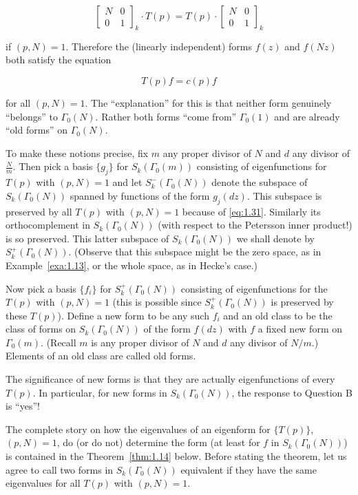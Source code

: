 \begin{equation}\label{eq:1.31}
\left[ \begin{array}{cc} N & 0 \\ 0 & 1 \end{array} \right]_k \cdot T(p) = T(p) \cdot \left[ \begin{array}{cc} N & 0 \\ 0 & 1 \end{array} \right]_k\tag{1.31}
\end{equation}

if $(p,N) = 1$. Therefore the (linearly independent) forms $f(z)$ and $f(Nz)$ both satisfy the equation

\[
T(p)f = c(p)f
\]

for all $(p,N) = 1$. The ``explanation'' for this is that neither form genuinely ``belongs'' to $\Gamma_0(N)$. Rather both forms ``come from'' $\Gamma_0(1)$ and are already ``old forms'' on $\Gamma_0(N)$.

To make these notions precise, fix $m$ any proper divisor of $N$ and $d$ any divisor of $\frac{N}{m}$. Then pick a basis $\{g_j\}$ for $S_k(\Gamma_0(m))$ consisting of eigenfunctions for $T(p)$ with $(p,N) = 1$ and let $S_k^-(\Gamma_0(N))$ denote the subspace of $S_k(\Gamma_0(N))$ spanned by functions of the form $g_j(dz)$. This subspace is preserved by all $T(p)$ with $(p,N) = 1$ because of \eqref{eq:1.31}. Similarly its orthocomplement in $S_k(\Gamma_0(N))$ (with respect to the Petersson inner product!) is so preserved. This latter subspace of $S_k(\Gamma_0(N))$ we shall denote by $S_k^+(\Gamma_0(N))$. (Observe that this subspace might be the zero space, as in Example~\ref{exa:1.13}, or the whole space, as in Hecke's case.)

Now pick a basis $\{f_i\}$ for $S_k^+(\Gamma_0(N))$ consisting of eigenfunctions for the $T(p)$ with $(p,N) = 1$ (this is possible since $S_k^+(\Gamma_0(N))$ is preserved by these $T(p)$). Define a new form to be any such $f_i$ and an old class to be the class of forms on $S_k(\Gamma_0(N))$ of the form $f(dz)$ with $f$ a fixed new form on $\Gamma_0(m)$. (Recall $m$ is any proper divisor of $N$ and $d$ any divisor of $N/m$.) Elements of an old class are called old forms.

The significance of new forms is that they are actually eigenfunctions of every $T(p)$. In particular, for new forms in $S_k(\Gamma_0(N))$, the response to Question B is ``yes''!

The complete story on how the eigenvalues of an eigenform for $\{T(p)\}$, $(p,N) = 1$, do (or do not) determine the form (at least for $f$ in $S_k(\Gamma_0(N))$) is contained in the Theorem~\ref{thm:1.14} below. Before stating the theorem, let us agree to call two forms in $S_k(\Gamma_0(N))$ equivalent if they have the same eigenvalues for all $T(p)$ with $(p,N) = 1$.

